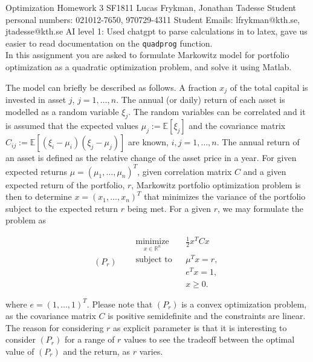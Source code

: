 \documentclass{assignment}
\def\code#1{\texttt{#1}}
\begin{document}
{Optimization}
{Homework 3}
{SF1811}
{Lucas Frykman, Jonathan Tadesse}
{Student personal numbers: 021012-7650, 970729-4311}
{Student Emails: lfrykman@kth.se, jtadesse@kth.se}
AI level 1: Used chatgpt to parse calculations in to latex, gave us easier to read documentation on
the \code{quadprog} function.
\\
In this assignment you are asked to formulate Markowitz model for portfolio optimization
as a quadratic optimization problem, and solve it using Matlab. 

The model can briefly be described as follows. A fraction $x_j$ of the total capital is invested
in asset $j$, $j=1,\dots,n$. The annual (or daily) return of each asset is modelled as a random
variable $\xi_j$. The random variables can be correlated and it is assumed that the expected
values $\mu_j := \mathbb{E}[\xi_j]$ and the covariance matrix $C_{ij} := \mathbb{E}[(\xi_i - \mu_i)(\xi_j - \mu_j)]$ are known,
$i,j=1,\dots,n$. The annual return of an asset is defined as the relative change of the asset
price in a year. For given expected returns $\mu = (\mu_1,\dots,\mu_n)^T$, given correlation matrix $C$
and a given expected return of the portfolio, $r$, Markowitz portfolio optimization problem
is then to determine $x = (x_1,\dots,x_n)^T$ that minimizes the variance of the portfolio subject
to the expected return $r$ being met. For a given $r$, we may formulate the problem as

\[
(P_r)\quad 
\begin{aligned}
&\underset{x\in\mathbb{R}^n}{\text{minimize}}   && \frac{1}{2} x^T C x \\
&\text{subject to} && \mu^T x = r, \\
&                  && e^T x = 1, \\
&                  && x \geq 0.
\end{aligned}
\]

where $e = (1,\dots,1)^T$. Please note that $(P_r)$ is a convex optimization problem, as the
covariance matrix $C$ is positive semidefinite and the constraints are linear. The reason for
considering $r$ as explicit parameter is that it is interesting to consider $(P_r)$ for a range of
$r$ values to see the tradeoff between the optimal value of $(P_r)$ and the return, as $r$ varies.
\end{document}
